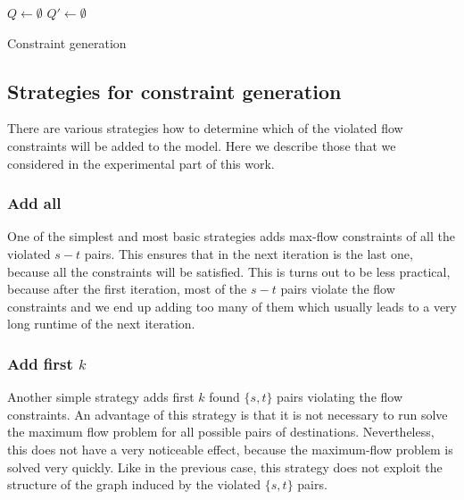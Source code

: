 \begin{algorithm}
 $Q\leftarrow\emptyset$
 $Q'\leftarrow\emptyset$
 ~\newline
 \caption{Constraint generation}
\label{alg:cg}
\end{algorithm}

\subsection{Strategies for constraint generation}

There are various strategies how to determine which of the violated flow constraints will be added to the model. Here we describe those that we considered in the experimental part of this work.

\subsubsection{Add all}
One of the simplest and most basic strategies adds max-flow constraints of all the violated $s-t$ pairs. This ensures that in the next iteration is the last one, because all the constraints will be satisfied. This is turns out to be less practical, because after the first iteration, most of the $s-t$ pairs violate the flow constraints and we end up adding too many of them which usually leads to a very long runtime of the next iteration.

\subsubsection{Add first $k$}

Another simple strategy adds first $k$ found $\{s,t\}$ pairs violating the flow constraints. An advantage of this strategy is that it is not necessary to run solve the maximum flow problem for all possible pairs of destinations. Nevertheless, this does not have a very noticeable effect, because the maximum-flow problem is solved very quickly. Like in the previous case, this strategy does not exploit the structure of the graph induced by the violated $\{s,t\}$ pairs.

